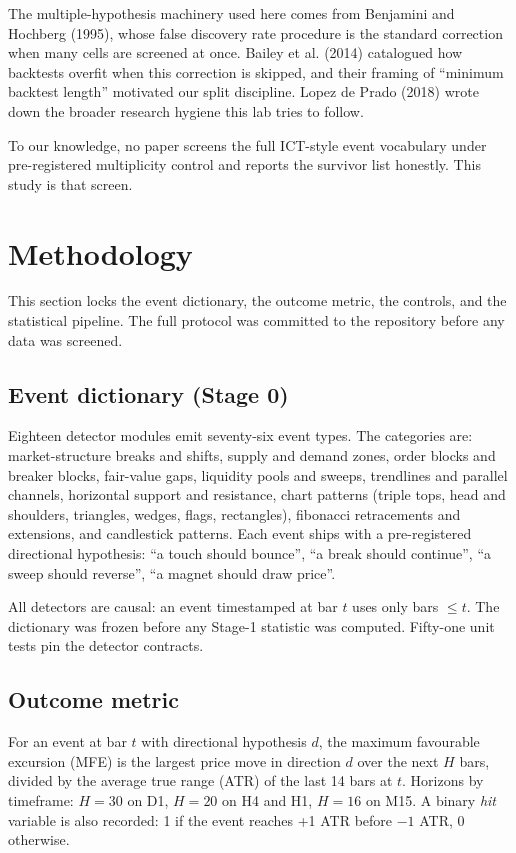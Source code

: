 \documentclass[11pt,a4paper]{article}
\begin{document}
The multiple-hypothesis machinery used here comes from Benjamini and
Hochberg (1995), whose false discovery rate procedure is the standard
correction when many cells are screened at once. Bailey et al. (2014)
catalogued how backtests overfit when this correction is skipped, and
their framing of \enquote{minimum backtest length} motivated our split
discipline. Lopez de Prado (2018) wrote down the broader research
hygiene this lab tries to follow.

To our knowledge, no paper screens the full ICT-style event vocabulary
under pre-registered multiplicity control and reports the survivor list
honestly. This study is that screen.

\section{Methodology}\label{sec:method}

This section locks the event dictionary, the outcome metric, the
controls, and the statistical pipeline. The full protocol was
committed to the repository before any data was screened.

\subsection{Event dictionary (Stage 0)}

Eighteen detector modules emit seventy-six event types. The categories
are: market-structure breaks and shifts, supply and demand zones, order
blocks and breaker blocks, fair-value gaps, liquidity pools and sweeps,
trendlines and parallel channels, horizontal support and resistance,
chart patterns (triple tops, head and shoulders, triangles, wedges,
flags, rectangles), fibonacci retracements and extensions, and
candlestick patterns. Each event ships with a pre-registered directional
hypothesis: \enquote{a touch should bounce}, \enquote{a break should
continue}, \enquote{a sweep should reverse}, \enquote{a magnet should
draw price}.

All detectors are causal: an event timestamped at bar $t$ uses only bars
$\leq t$. The dictionary was frozen before any Stage-1 statistic was
computed. Fifty-one unit tests pin the detector contracts.

\subsection{Outcome metric}

For an event at bar $t$ with directional hypothesis $d$, the maximum
favourable excursion (MFE) is the largest price move in direction $d$
over the next $H$ bars, divided by the average true range (ATR) of the
last 14 bars at $t$. Horizons by timeframe: $H = 30$ on D1, $H = 20$ on
H4 and H1, $H = 16$ on M15. A binary \emph{hit} variable is also recorded:
1 if the event reaches +1 ATR before $-1$ ATR, 0 otherwise.
\end{document}
